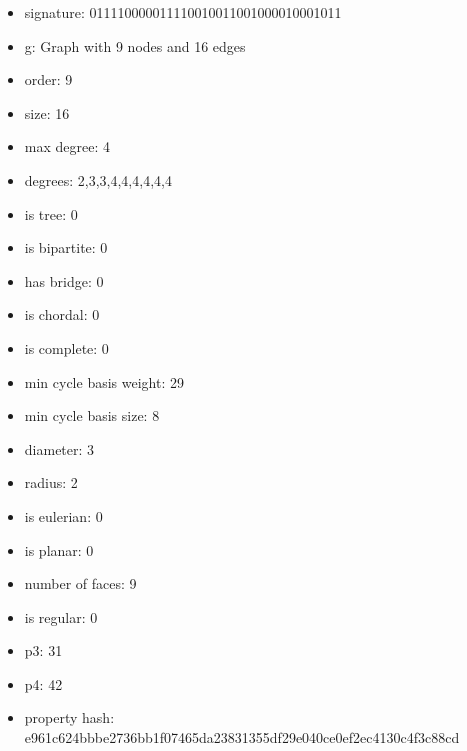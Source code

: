 \newpage
\begin{figure}
\end{figure}
\begin{itemize}
\item signature: 011110000011110010011001000010001011
\item g: Graph with 9 nodes and 16 edges
\item order: 9
\item size: 16
\item max degree: 4
\item degrees: 2,3,3,4,4,4,4,4,4
\item is tree: 0
\item is bipartite: 0
\item has bridge: 0
\item is chordal: 0
\item is complete: 0
\item min cycle basis weight: 29
\item min cycle basis size: 8
\item diameter: 3
\item radius: 2
\item is eulerian: 0
\item is planar: 0
\item number of faces: 9
\item is regular: 0
\item p3: 31
\item p4: 42
\item property hash: e961c624bbbe2736bb1f07465da23831355df29e040ce0ef2ec4130c4f3c88cd
\end{itemize}
